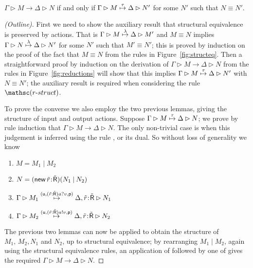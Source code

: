 \documentclass{LMCS}
\newcommand{\pfn}[1]{\mathsf{#1}}  \newcommand{\cfn}[1]{\mathsf{#1}}  \newcommand{\ownfnt}[1]{{\mathsf{#1}}}
\newcommand{\with}{\mathbin \rhd}
\newcommand{\cancom}[3]{({\ownfnt{#1}},{#2},{\ownfnt{#3}}) \xspace}
\newcommand{\typeletter}[1]{{\mathsf{#1}}}
\newcommand{\tR}{\typeletter{R}}
\newcommand{\Cassoc}[2]{ {{#1}\kern -0.2em : \kern -0.2em {#2}}}
\newcommand{\Cnew}[2]{(\mathop{\pfn{new}} \Cassoc{#1}{#2})}
\newcommand{\Cpar}{\mathbin{|}}
\newcommand{\smalleval}{\longrightarrow}  \newcommand{\csmalleval}[1]{\longrightarrow^{#1}}
\newcommand{\structeq}{\equiv}
\begin{document}
\begin{thm}\label{prop:red.tau}
$\Gamma \with M \smalleval \Delta \with N$ if and only if
        $\Gamma \with M \newar{\tau} \Delta \with N'$ for some 
   $N'$ such that $N \structeq N'$.
 \begin{proof}[(Outline)]

   First we need to show  the auxiliary result that structural
   equivalence is preserved by actions. That is $\Gamma \with M
   \newar{\lambda} \Delta \with M'$ and $M \structeq N$ implies $\Gamma \with N
   \newar{\lambda} \Delta \with N'$ for some $N'$ such that $M' \structeq N'$; this
   is proved by induction on the proof of the fact that $M \structeq
   N$ from the rules in Figure~\ref{fig:structeq}. Then a
   straightforward proof by induction on the derivation of $\Gamma
   \with M \smalleval \Delta \with N$ from the rules in
   Figure~\ref{fig:reductions} will show that this implies $\Gamma
   \with M \newar{\tau} \Delta \with N'$ with $N \structeq N'$; the
   auxiliary result is required when considering the rule
   $\Rred{struct}$.

   To prove the converse we also employ the two previous lemmas, giving
   the structure of input and output actions. Suppose $\Gamma \with M
   \newar{\tau} \Delta \with N$; we prove by rule induction that
   $\Gamma \with M \smalleval \Delta \with N$. The only non-trivial case is
   when this judgement is inferred using the rule , or its dual. So 
without loss of generality we know 
   \begin{enumerate}[$\bullet$]
   \item $M = M_1 \Cpar M_2$
   \item $N = \Cnew{ {\tilde r}}{{\tilde \tR}   }(N_1 \Cpar N_2) $
   \item $\Gamma \with M_1 \newar{\cancom{u}{({\tilde{r}}:{\tilde{\tR}}) a?v}{p}} 
         \Delta,\Cassoc{\tilde{r}}{\tilde{\tR}} \with N_1$
   \item $\Gamma \with M_2 \newar{\cancom{u}{({\tilde{r}}:{\tilde{\tR}}) a!v}{p}} 
         \Delta,\Cassoc{\tilde{r}}{\tilde{\tR}} \with N_2$
   \end{enumerate}
The previous two lemmas can now be applied to obtain the structure of $M_1,\,M_2, N_1$ and
$N_2$, up to structural equivalence; by rearranging $M_1 \Cpar M_2$, again using the structural
equivalence rules, an application of  followed by one of  gives the
required 
 $\Gamma \with M \smalleval \Delta \with N$.
  \end{proof}
\end{thm}
\end{document}
